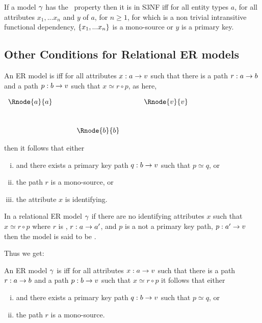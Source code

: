 \begin{lemma}
If a model $\gamma$ has the \fdfactoring\ property then it is in S3NF iff
for all entity types $a$, for all attributes $x_1,...x_n$ and $y$ of $a$, for $n \geq 1$, 
for which  is a non trivial intransitive functional dependency,
$\left\{x_1,...x_n\right\}$ is a mono-source or $y$ is a primary key. 
\end{lemma}
\subsection{Other Conditions for Relational ER models}
\begin{definition} 
An ER model is  iff for all attributes $x:a \rightarrow v$ 
such that there is a   path $r:a \rightarrow b$ and a  path $p:b \rightarrow v$ such that
$x \simeq r \circ p$, as here,
\setlength{\arraycolsep}{.2cm}
\begin{center}
$
\begin{array}{cp{0.5cm}c p{0.5cm} c}
\Rnode{a}{a} &  &              & & \Rnode{v}{\veee}  \\ [1cm]
             &  & \Rnode{b}{b} & &               
\end{array}
$
\end{center}

then it follows that 
either 
\begin{enumerate} [(i)]
\item {} and there exists a primary key path $q:b \rightarrow v$ such that $p \simeq q$, or
\item the path $r$ is a mono-source, or
\item the attribute $x$ is identifying.
\end{enumerate}
\end{definition}

In a relational ER model $\gamma$ if there are no identifying attributes $x$ such that $x \simeq r \circ p$ where $r$ is , $r:a \rightarrow a'$, and $p$ is a not a primary key path, $p:a' \rightarrow v$ then the model is said to be .

Thus we get:
\begin{definition} 
An ER model $\gamma$ is  iff for all attributes $x:a \rightarrow v$
such that there is a   path $r:a \rightarrow b$ and a  path $p:b \rightarrow v$ such that $x \simeq r \circ p$ it follows that 
either 
\begin{enumerate} [(i)]
\item {} and there exists a primary key path  $q:b \rightarrow v$ such that $p \simeq q$, or
\item the path $r$ is a mono-source.
\end{enumerate}
\end{definition}

